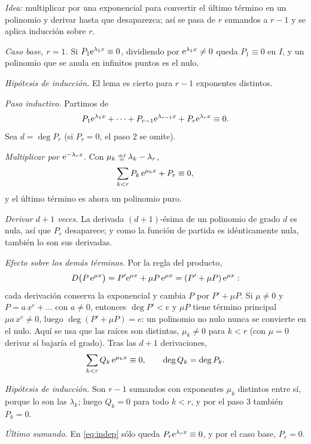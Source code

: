 \documentclass[11pt,twoside]{article}
\begin{document}
\begin{demostracion}
\emph{Idea:} multiplicar por una exponencial para convertir el último término en un polinomio y derivar hasta que
desaparezca; así se pasa de $r$ sumandos a $r-1$ y se aplica inducción sobre $r$.

\emph{Caso base, $r=1$.} Si $P_1\mathrm{e}^{\lambda_1x}\equiv0$, dividiendo por $\mathrm{e}^{\lambda_1x}\neq0$ queda $P_1\equiv0$ en $I$, y
un polinomio que se anula en infinitos puntos es el nulo.

\emph{Hipótesis de inducción.} El lema es cierto para $r-1$ exponentes distintos.

\emph{Paso inductivo.} Partimos de
\begin{equation}\label{eq:indep}
P_1\mathrm{e}^{\lambda_1x}+\dots+P_{r-1}\mathrm{e}^{\lambda_{r-1}x}+P_r\mathrm{e}^{\lambda_rx}\equiv0.
\end{equation}
Sea $d=\deg P_r$ (si $P_r=0$, el paso 2 se omite).
\begin{pasos}
\item \emph{Multiplicar por $\mathrm{e}^{-\lambda_rx}$.} Con $\mu_k\defeq\lambda_k-\lambda_r$,
\begin{equation*}
\sum_{k<r}P_k\,\mathrm{e}^{\mu_kx}+P_r\equiv0,
\end{equation*}
y el último término es ahora un polinomio puro.
\item \emph{Derivar $d+1$ veces.} La derivada $(d+1)$-ésima de un polinomio de grado $d$ es nula, así que $P_r$
desaparece; y como la función de partida es idénticamente nula, también lo son sus derivadas.
\item \emph{Efecto sobre los demás términos.} Por la regla del producto,
\begin{equation*}
D\big(P\,\mathrm{e}^{\mu x}\big)=P'\mathrm{e}^{\mu x}+\mu P\,\mathrm{e}^{\mu x}=(P'+\mu P)\,\mathrm{e}^{\mu x}:
\end{equation*}
cada derivación conserva la exponencial y cambia $P$ por $P'+\mu P$. Si $\mu\neq0$ y $P=a\,x^e+\dots$ con $a\neq0$,
entonces $\deg P'<e$ y $\mu P$ tiene término principal $\mu a\,x^e\neq0$, luego $\deg(P'+\mu P)=e$: un polinomio no nulo
nunca se convierte en el nulo. Aquí se usa que las raíces son distintas, $\mu_k\neq0$ para $k<r$ (con $\mu=0$ derivar sí
bajaría el grado). Tras las $d+1$ derivaciones,
\begin{equation*}
\sum_{k<r}Q_k\,\mathrm{e}^{\mu_kx}\equiv0,\qquad\deg Q_k=\deg P_k.
\end{equation*}
\item \emph{Hipótesis de inducción.} Son $r-1$ sumandos con exponentes $\mu_k$ distintos entre sí, porque lo son las
$\lambda_k$; luego $Q_k=0$ para todo $k<r$, y por el paso 3 también $P_k=0$.
\item \emph{Último sumando.} En \eqref{eq:indep} sólo queda $P_r\mathrm{e}^{\lambda_rx}\equiv0$, y por el caso base, $P_r=0$.
\end{pasos}
\end{demostracion}
\end{document}
